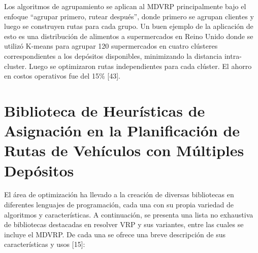 

Los algoritmos de agrupamiento se aplican al MDVRP principalmente bajo el enfoque ``agrupar primero, rutear despu\'es'', donde primero se agrupan clientes y luego se construyen rutas para cada grupo. Un buen ejemplo de la aplicaci\'on de esto es una distribuci\'on de alimentos a supermercados en Reino Unido donde se utiliz\'o K-means para agrupar 120 supermercados en cuatro cl\'usteres correspondientes a los dep\'ositos disponibles, minimizando la distancia intra-cluster. Luego se optimizaron rutas independientes para cada cl\'uster. El ahorro en costos operativos fue del 15\% [43].

\section{Biblioteca de Heur\'isticas de Asignaci\'on en la Planificaci\'on de Rutas de Veh\'iculos con M\'ultiples Dep\'ositos}

El \'area de optimizaci\'on ha llevado a la creaci\'on de diversas bibliotecas en diferentes lenguajes de programaci\'on, cada una con su propia variedad de algoritmos y caracter\'isticas. A continuaci\'on, se presenta una lista no exhaustiva de bibliotecas destacadas en resolver VRP y sus variantes, entre las cuales se incluye el MDVRP. De cada una se ofrece una breve descripci\'on de sus caracter\'isticas y usos [15]:

